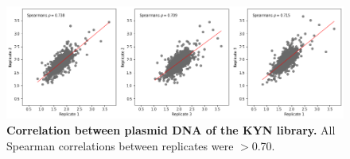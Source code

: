 \begin{figure}[h]
    \centering
    \includegraphics[scale=.5]{3_figures-and-files/FigS2_DNA-Correlation.png}
    \caption[Correlation between plasmid DNA of the KYN library]{\textbf{Correlation between plasmid DNA of the KYN library.} All Spearman correlations between replicates were $>$0.70.}
    \label{fig:plasmid DNA correlation kyn library}
\end{figure}
